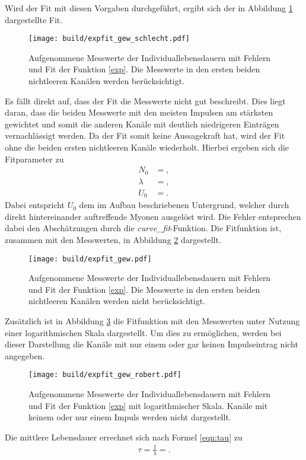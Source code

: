 Wird der Fit mit diesen Vorgaben durchgeführt, ergibt sich der in Abbildung \ref{plot:punkte_err_fit_schlecht} dargestellte Fit.
\begin{figure}
  \centering
  \texttt{[image: build/expfit\_gew\_schlecht.pdf]}
  \caption{Aufgenommene Messwerte der Individuallebensdauern mit Fehlern und Fit der Funktion \eqref{exp}. Die Messwerte in den ersten beiden nichtleeren Kanälen werden berücksichtigt.}
  \label{plot:punkte_err_fit_schlecht}
\end{figure}
Es fällt direkt auf, dass der Fit die Messwerte nicht gut beschreibt.
Dies liegt daran, dass die beiden Messwerte mit den meisten Impulsen am stärksten gewichtet und somit die anderen Kanäle mit deutlich niedrigeren Einträgen vernachlässigt werden.
Da der Fit somit keine Aussagekraft hat, wird der Fit ohne die beiden ersten nichtleeren Kanäle wiederholt.
Hierbei ergeben sich die Fitparameter zu
\begin{align}
  \label{params}
  N_0 &= ,\\
  \lambda &= ,\\
  U_0 &= .
\end{align}
Dabei entspricht $U_0$ dem im Aufbau beschriebenen Untergrund, welcher durch direkt hintereinander auftreffende Myonen ausgelöst wird.
Die Fehler entsprechen dabei den Abschätzungen durch die \emph{curve\_fit}-Funktion.
Die Fitfunktion ist, zusammen mit den Messwerten, in Abbildung \ref{plot:punkte_err_fit} dargestellt.
\begin{figure}
  \centering
  \texttt{[image: build/expfit\_gew.pdf]}
  \caption{Aufgenommene Messwerte der Individuallebensdauern mit Fehlern und Fit der Funktion \eqref{exp}. Die Messwerte in den ersten beiden nichtleeren Kanälen werden nicht berücksichtigt.}
  \label{plot:punkte_err_fit}
\end{figure}
Zusätzlich ist in Abbildung \ref{plot:punkte_err_fit_robert} die Fitfunktion mit den Messwerten unter Nutzung einer logarithmischen Skala dargestellt.
Um dies zu ermöglichen, werden bei dieser Darstellung die Kanäle mit nur einem oder gar keinen Impulseintrag nicht angegeben.
\begin{figure}
  \centering
  \texttt{[image: build/expfit\_gew\_robert.pdf]}
  \caption{Aufgenommene Messwerte der Individuallebensdauern mit Fehlern und Fit der Funktion \eqref{exp} mit logarithmischer Skala. Kanäle mit keinem oder nur einem Impuls werden nicht dargestellt.}
  \label{plot:punkte_err_fit_robert}
\end{figure}
Die mittlere Lebensdauer errechnet sich nach Formel \eqref{eqn:tau} zu
\begin{align}
  \label{eqn:result}
  \tau = \frac{1}{\lambda} = .
\end{align}

